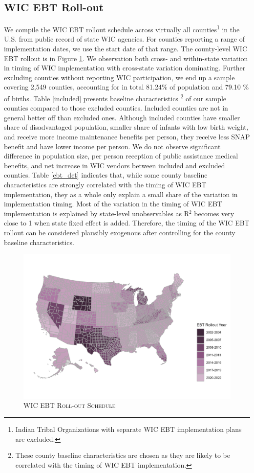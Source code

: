 \subsection{WIC EBT Roll-out}
We compile the WIC EBT rollout schedule across virtually all counties\footnote{Indian Tribal Organizations with separate WIC EBT implementation plans are excluded.} in the U.S. from public record of state WIC agencies. For counties reporting a range of implementation dates, we use the start date of that range. The county-level WIC EBT rollout is in Figure \ref{map}. We observation both cross- and within-state variation in timing of WIC implementation with cross-state variation dominating. Further excluding counties without reporting WIC participation, we end up a sample covering 2,549 counties, accounting for in total 81.24\% of population and 79.10 \% of births. Table \ref{included} presents baseline characteristics \footnote{These county baseline characteristics are chosen as they are likely to be correlated with the timing of WIC EBT implementation.} of our sample counties compared to those excluded counties. Included counties are not in general better off than excluded ones. Although included counties have smaller share of disadvantaged population, smaller share of infants with low birth weight, and receive more income maintenance benefits per person, they receive less SNAP benefit and have lower income per person. We do not observe significant difference in population size, per person reception of public assistance medical benefits, and net increase in WIC vendors between included and excluded counties. Table \ref{ebt_det} indicates that, while some county baseline characteristics are strongly correlated with the timing of WIC EBT implementation, they as a whole only explain a small share of the variation in implementation timing. Most of the variation in the timing of WIC EBT implementation is explained by state-level unobservables as R$^2$ becomes very close to 1 when state fixed effect is added. Therefore, the timing of the WIC EBT rollout can be considered plausibly exogenous after controlling for the county baseline characteristics.

\begin{figure}
	\begin{center}
		\includegraphics[width=.8\textwidth]{ewic_rollout_county_year.png}  
		\caption{\textsc{WIC EBT Roll-out Schedule}}
		\label{map}
	\end{center}
	\footnotesize
\end{figure}


